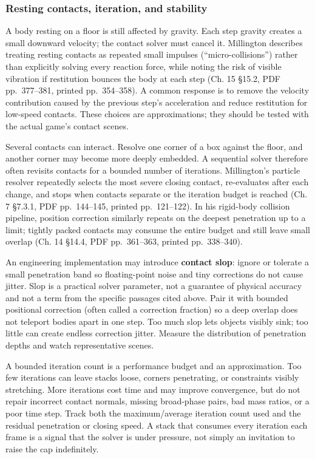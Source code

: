 \subsubsection{Resting contacts, iteration, and stability}\label{resting-contacts-iteration-and-stability}

A body resting on a floor is still affected by gravity. Each step gravity creates a small downward velocity; the contact solver must cancel it. Millington describes treating resting contacts as repeated small impulses (``micro-collisions'') rather than explicitly solving every reaction force, while noting the risk of visible vibration if restitution bounces the body at each step (Ch. 15 §15.2, PDF pp.~377--381, printed pp.~354--358). A common response is to remove the velocity contribution caused by the previous step's acceleration and reduce restitution for low-speed contacts. These choices are approximations; they should be tested with the actual game's contact scenes.

Several contacts can interact. Resolve one corner of a box against the floor, and another corner may become more deeply embedded. A sequential solver therefore often revisits contacts for a bounded number of iterations. Millington's particle resolver repeatedly selects the most severe closing contact, re-evaluates after each change, and stops when contacts separate or the iteration budget is reached (Ch. 7 §7.3.1, PDF pp.~144--145, printed pp.~121--122). In his rigid-body collision pipeline, position correction similarly repeats on the deepest penetration up to a limit; tightly packed contacts may consume the entire budget and still leave small overlap (Ch. 14 §14.4, PDF pp.~361--363, printed pp.~338--340).

An engineering implementation may introduce \textbf{contact slop}: ignore or tolerate a small penetration band so floating-point noise and tiny corrections do not cause jitter. Slop is a practical solver parameter, not a guarantee of physical accuracy and not a term from the specific passages cited above. Pair it with bounded positional correction (often called a correction fraction) so a deep overlap does not teleport bodies apart in one step. Too much slop lets objects visibly sink; too little can create endless correction jitter. Measure the distribution of penetration depths and watch representative scenes.

A bounded iteration count is a performance budget and an approximation. Too few iterations can leave stacks loose, corners penetrating, or constraints visibly stretching. More iterations cost time and may improve convergence, but do not repair incorrect contact normals, missing broad-phase pairs, bad mass ratios, or a poor time step. Track both the maximum/average iteration count used and the residual penetration or closing speed. A stack that consumes every iteration each frame is a signal that the solver is under pressure, not simply an invitation to raise the cap indefinitely.

